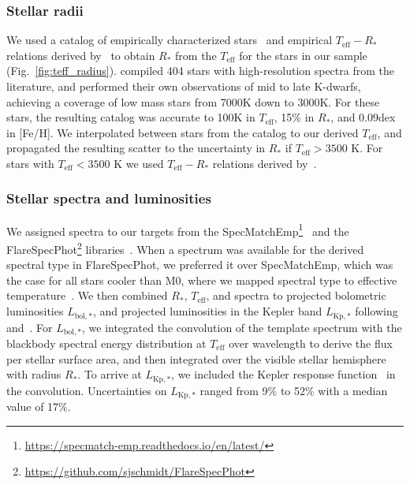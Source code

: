 \documentclass{aa}
\begin{document}
\subsubsection{Stellar radii}
\label{sec:sec:sec:r}
We used a catalog of empirically characterized stars~\citep{yee_specmatch_2017} and empirical $T_\mathrm{eff}-R_*$ relations derived by~\citet{mann_how_2015,mann_erratum_2016} to obtain $R_*$ from the $T_\mathrm{eff}$ for the stars in our sample (Fig.~\ref{fig:teff_radius}). \citet{yee_specmatch_2017} compiled 404 stars with high-resolution spectra from the literature, and performed their own observations of mid to late K-dwarfs, achieving a coverage of low mass stars from 7000\;K down to 3000\;K. For these stars, the resulting catalog was accurate to 100\;K in
$T_\mathrm{eff}$, 15\;\% in $R_*$, and 0.09\;dex in [Fe/H]. We interpolated between stars from the catalog to our derived $T_\mathrm{eff}$,  and propagated the resulting scatter to the uncertainty in $R_*$ if $T_\mathrm{eff}>3500$ K. For stars with \mbox{$T_\mathrm{eff}< 3500$} K we used $T_\mathrm{eff}-R_*$ relations derived by~\citet{mann_how_2015,mann_erratum_2016}. 
\subsubsection{Stellar spectra and luminosities}
\label{sec:lum}
We assigned spectra to our targets from the SpecMatchEmp\footnote{\url{https://specmatch-emp.readthedocs.io/en/latest/}}~\citep{yee_specmatch_2017} and the FlareSpecPhot\footnote{\url{https://github.com/sjschmidt/FlareSpecPhot}} libraries~\citep{Kirkpatrick2010, Burgasser2007, Burgasser2008, Burgasser2010, Burgasser2004, Cruz2004, Burgasser2006, Rayner2009, Doi2010, Filippazzo2015, Cruz2003, West2011, Bochanski2010,  Bochanski2007, Schmidt2010, schmidt2015, Schmidt2014a, Schmidt2014b, mann_how_2015}. When a spectrum was available for the derived spectral type in FlareSpecPhot, we preferred it over SpecMatchEmp, which was the case for all stars cooler than M0, where we mapped spectral type to effective temperature~\citep{pecaut_intrinsic_2013}. We then combined $R_*$, $T_\mathrm{eff}$, and spectra to projected bolometric luminosities $L_{\mathrm{bol,*}}$, and projected luminosities in the Kepler band $L_{\mathrm{Kp,*}}$ following~\citet{shibayama2013} and~. For $L_{\mathrm{bol,*}}$, we integrated the convolution of the template spectrum with the blackbody spectral energy distribution at $T_\mathrm{eff}$ over wavelength to derive the flux per stellar surface area, and then integrated over the visible stellar hemisphere with radius $R_*$. To arrive at $L_{\mathrm{Kp,*}}$, we included the Kepler response function~\citep{vancleve2016} in the convolution. Uncertainties on $L_{\mathrm{Kp,*}}$ ranged from 9\;\% to 52\;\% with a median value of 17\;\%.
\end{document}
